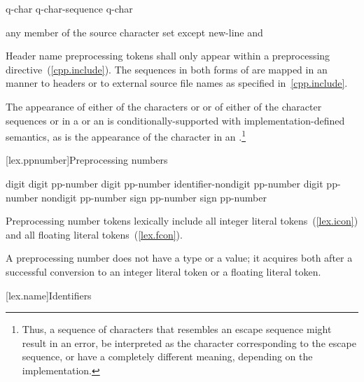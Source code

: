 \begin{bnf}
\br
    q-char\br
    q-char-sequence q-char
\end{bnf}

\begin{bnf}
\br
    \textnormal{any member of the source character set except new-line and }
\end{bnf}

\pnum
Header name preprocessing tokens shall only appear within a
 preprocessing directive~(\ref{cpp.include}). The
sequences in both forms of  are mapped in an
 manner to headers or to
external source file names as specified in~\ref{cpp.include}.

\pnum
The appearance of either of the characters  or \tcode{\textbackslash} or of
either of the character sequences \tcode{/*} or \tcode{//} in a
 or an 
is conditionally-supported with implementation-defined semantics,
as is the appearance of the
character  in an .\footnote{Thus, a
sequence of characters that resembles an escape sequence might result in an
error, be interpreted as the character corresponding to the escape sequence, or
have a completely different meaning, depending on the implementation.}%

[lex.ppnumber]{Preprocessing numbers}

%
\begin{bnf}
\br
    digit\br
     digit\br
    pp-number digit\br
    pp-number identifier-nondigit\br
    pp-number  digit\br
    pp-number  nondigit\br
    pp-number  sign\br
    pp-number  sign\br
    pp-number 
\end{bnf}

\pnum
Preprocessing number tokens lexically include all integer literal
tokens~(\ref{lex.icon}) and all floating literal
tokens~(\ref{lex.fcon}).

\pnum
A preprocessing number does not have a type or a value; it acquires both
after a successful conversion to an integer literal token or a floating literal
token.%

[lex.name]{Identifiers}


